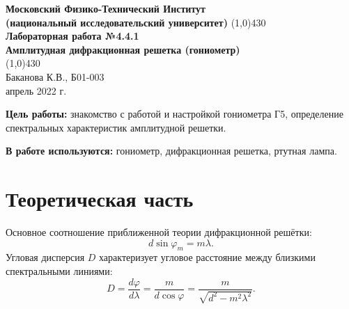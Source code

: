 \documentclass[a4paper, 12pt]{article}%
\begin{document}
\begin{titlepage}

\begin{center}
\large\textbf{Московский Физико-Технический Институт}\\
\large\textbf{(национальный исследовательский университет)}
\vfill
\line(1,0){430}\\[3mm]
\huge\textbf{Лабораторная работа №4.4.1}\\
\large\textbf{Амплитудная дифракционная решетка (гониометр)}\\
\line(1,0){430}\\[1mm]
\vfill
\large Баканова К.В., Б01-003\\
\large апрель 2022 г.\\
\end{center}

\end{titlepage}
	\textbf{Цель работы:} знакомство с работой и настройкой гониометра Г5, определение спектральных характеристик амплитудной решетки.
	
\textbf{       }

	\textbf{В работе используются:}  гониометр, дифракционная решетка, ртутная лампа.
		
			\textbf{       }
			
\section{Теоретическая часть}
	\noindent Основное соотношение приближенной теории дифракционной решётки:
	\begin{equation}
	d\sin \varphi_m = m\lambda.
	\end{equation}
	Угловая дисперсия $D$ характеризует угловое расстояние между близкими спектральными линиями:
	\begin{equation}
	D = \frac{d\varphi}{d\lambda} = \frac{m}{d \cos \varphi}=\frac{m}{\sqrt{d^{2}-m^{2} \lambda^{2}}}.
	\end{equation}
	
			\textbf{       }
			
\end{document}
